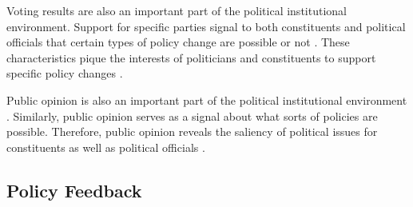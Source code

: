 Voting results are also an important part of the political institutional environment. Support for specific parties signal to both constituents and political officials that certain types of policy change are possible or not \citep{amenta_and_elliott_2019}. These characteristics pique the interests of politicians and constituents to support specific policy changes \citep{berry_and_berry_1990,boushey_2016}. 

Public opinion is also an important part of the political institutional environment \citep{burstein_1998,burstein_2003}. Similarly, public opinion serves as a signal about what sorts of policies are possible. Therefore, public opinion reveals the saliency of political issues for constituents as well as political officials \citep{pacheco_2012,nicholson-crotty_2009}.






\subsection{Policy Feedback}


